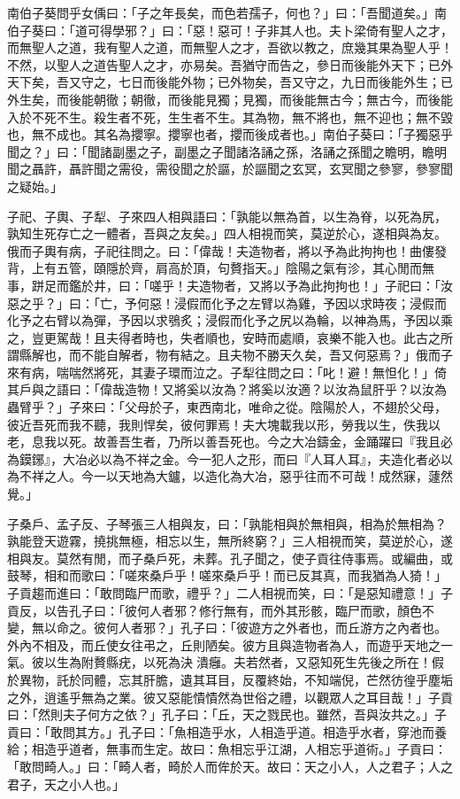 \begin{pinyinscope}
南伯子葵問乎女偊曰：「子之年長矣，而色若孺子，何也？」曰：「吾聞道矣。」南伯子葵曰：「道可得學邪？」曰：「惡！惡可！子非其人也。夫卜梁倚有聖人之才，而無聖人之道，我有聖人之道，而無聖人之才，吾欲以教之，庶幾其果為聖人乎！不然，以聖人之道告聖人之才，亦易矣。吾猶守而告之，參日而後能外天下；已外天下矣，吾又守之，七日而後能外物；已外物矣，吾又守之，九日而後能外生；已外生矣，而後能朝徹；朝徹，而後能見獨；見獨，而後能無古今；無古今，而後能入於不死不生。殺生者不死，生生者不生。其為物，無不將也，無不迎也；無不毀也，無不成也。其名為攖寧。攖寧也者，攖而後成者也。」南伯子葵曰：「子獨惡乎聞之？」曰：「聞諸副墨之子，副墨之子聞諸洛誦之孫，洛誦之孫聞之瞻明，瞻明聞之聶許，聶許聞之需役，需役聞之於謳，於謳聞之玄冥，玄冥聞之參寥，參寥聞之疑始。」

子祀、子輿、子犁、子來四人相與語曰：「孰能以無為首，以生為脊，以死為尻，孰知生死存亡之一體者，吾與之友矣。」四人相視而笑，莫逆於心，遂相與為友。俄而子輿有病，子祀往問之。曰：「偉哉！夫造物者，將以予為此拘拘也！曲僂發背，上有五管，頤隱於齊，肩高於頂，句贅指天。」陰陽之氣有沴，其心閒而無事，跰足而鑑於井，曰：「嗟乎！夫造物者，又將以予為此拘拘也！」子祀曰：「汝惡之乎？」曰：「亡，予何惡！浸假而化予之左臂以為雞，予因以求時夜；浸假而化予之右臂以為彈，予因以求鴞炙；浸假而化予之尻以為輪，以神為馬，予因以乘之，豈更駕哉！且夫得者時也，失者順也，安時而處順，哀樂不能入也。此古之所謂縣解也，而不能自解者，物有結之。且夫物不勝天久矣，吾又何惡焉？」俄而子來有病，喘喘然將死，其妻子環而泣之。子犁往問之曰：「叱！避！無怛化！」倚其戶與之語曰：「偉哉造物！又將奚以汝為？將奚以汝適？以汝為鼠肝乎？以汝為蟲臂乎？」子來曰：「父母於子，東西南北，唯命之從。陰陽於人，不翅於父母，彼近吾死而我不聽，我則悍矣，彼何罪焉！夫大塊載我以形，勞我以生，佚我以老，息我以死。故善吾生者，乃所以善吾死也。今之大冶鑄金，金踊躍曰『我且必為鏌鋣』，大冶必以為不祥之金。今一犯人之形，而曰『人耳人耳』，夫造化者必以為不祥之人。今一以天地為大鑪，以造化為大冶，惡乎往而不可哉！成然寐，蘧然覺。」

子桑戶、孟子反、子琴張三人相與友，曰：「孰能相與於無相與，相為於無相為？孰能登天遊霧，撓挑無極，相忘以生，無所終窮？」三人相視而笑，莫逆於心，遂相與友。莫然有閒，而子桑戶死，未葬。孔子聞之，使子貢往侍事焉。或編曲，或鼓琴，相和而歌曰：「嗟來桑戶乎！嗟來桑戶乎！而已反其真，而我猶為人猗！」子貢趨而進曰：「敢問臨尸而歌，禮乎？」二人相視而笑，曰：「是惡知禮意！」子貢反，以告孔子曰：「彼何人者邪？修行無有，而外其形骸，臨尸而歌，顏色不變，無以命之。彼何人者邪？」孔子曰：「彼遊方之外者也，而丘游方之內者也。外內不相及，而丘使女往弔之，丘則陋矣。彼方且與造物者為人，而遊乎天地之一氣。彼以生為附贅縣疣，以死為決𤴯潰癰。夫若然者，又惡知死生先後之所在！假於異物，託於同體，忘其肝膽，遺其耳目，反覆終始，不知端倪，芒然彷徨乎塵垢之外，逍遙乎無為之業。彼又惡能憒憒然為世俗之禮，以觀眾人之耳目哉！」子貢曰：「然則夫子何方之依？」孔子曰：「丘，天之戮民也。雖然，吾與汝共之。」子貢曰：「敢問其方。」孔子曰：「魚相造乎水，人相造乎道。相造乎水者，穿池而養給；相造乎道者，無事而生定。故曰：魚相忘乎江湖，人相忘乎道術。」子貢曰：「敢問畸人。」曰：「畸人者，畸於人而侔於天。故曰：天之小人，人之君子；人之君子，天之小人也。」


\end{pinyinscope}
